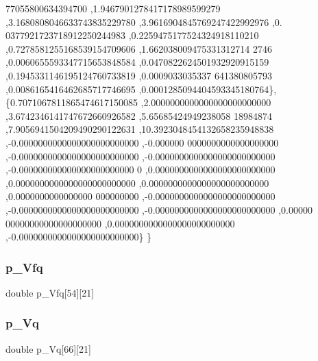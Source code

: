 \begin{DoxyCode}
      77055800634394700 ,1.9467901278417178989599279 ,3.1680808046633743835229780 ,3.9616904845769247422992976 ,0.
      0377921723718912250244983 ,0.2259475177524324918110210 ,0.7278581255168539154709606 ,1.662038009475331312714
      2746 ,0.0060655593347715653848584 ,0.0470822624501932920915159 ,0.1945331146195124760733819 ,0.0009033035337
      641380805793 ,0.0086165416462685717746695 ,0.0001285094404593345180764\},
\{0.7071067811865474617150085 ,2.0000000000000000000000000 ,3.6742346141747672660926582 ,5.65685424949238058
      18984874 ,7.9056941504209490290122631 ,10.3923048454132658235948838 ,-0.0000000000000000000000000 ,-0.000000
      0000000000000000000 ,-0.0000000000000000000000000 ,-0.0000000000000000000000000 ,-0.000000000000000000000000
      0 ,0.0000000000000000000000000 ,0.0000000000000000000000000 ,0.0000000000000000000000000 ,0.0000000000000000
      000000000 ,-0.0000000000000000000000000 ,-0.0000000000000000000000000 ,-0.0000000000000000000000000 ,0.00000
      00000000000000000000 ,0.0000000000000000000000000 ,-0.0000000000000000000000000\}
\}
\end{DoxyCode}
\mbox{\label{a00999_a2ba7c46dd1bf357dc568d9802596d507}} 
\subsubsection{\texorpdfstring{p\+\_\+\+Vfq}{p\_Vfq}}
{\footnotesize\ttfamily double p\+\_\+\+Vfq\mbox{[}54\mbox{]}\mbox{[}21\mbox{]}}

\mbox{\label{a00999_a29cc971db2038dd024074da591988d7a}} 
\subsubsection{\texorpdfstring{p\+\_\+\+Vq}{p\_Vq}}
{\footnotesize\ttfamily double p\+\_\+\+Vq\mbox{[}66\mbox{]}\mbox{[}21\mbox{]}}

\mbox{\label{a00999_ad351e11c0d0be2d81630fd365a498a4a}} 
